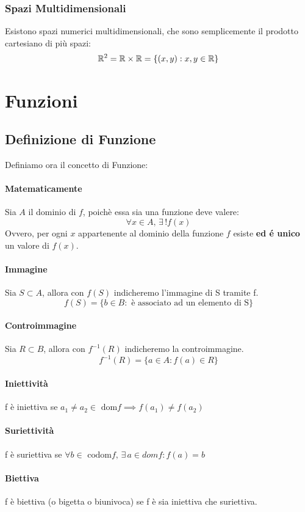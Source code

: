     \subsubsection*{Spazi Multidimensionali}
    Esistono spazi numerici multidimensionali, che sono semplicemente il prodotto cartesiano di più spazi:
    \[ \mathbb{R}^2 = \mathbb{R} \times \mathbb{R} = \{ (x,y):x,y\in \mathbb{R}\}\]
    \section*{Funzioni} 
    \subsection*{Definizione di Funzione}
    Definiamo ora il concetto di Funzione:
    \paragraph{Matematicamente} Sia $A$ il dominio di $f$, poichè essa sia una funzione deve valere:
    \[ \forall x \in A,\, \exists \, ! f(x) \]
    Ovvero, per ogni $x$ appartenente al dominio della funzione $f$ esiste \textbf{ed é unico} un valore di $f(x)$.

    \paragraph*{Immagine}Sia $S \subset A$, allora con $f(S)$ indicheremo l'immagine di S tramite f.
    \[ f(S)=\{b \in B: \text{ è associato ad un elemento di S}\} \]
    \paragraph*{Controimmagine} Sia $R \subset B$, allora con $f^{-1}(R)$ indicheremo la controimmagine.
    \[ f^{-1}(R)=\{a \in A: f(a) \in R \} \]
    \paragraph*{Iniettività} f è iniettiva se $ a_1 \neq a_2 \in \text{ dom}f \implies f(a_1) \neq f(a_2)$
    \paragraph*{Suriettività} f è suriettiva se $\forall b \in \text{ codom}f, \, \exists \, a \in dom f:f(a)=b$
    \paragraph*{Biettiva} f è biettiva (o bigetta o biunivoca) se f è sia iniettiva che suriettiva.

